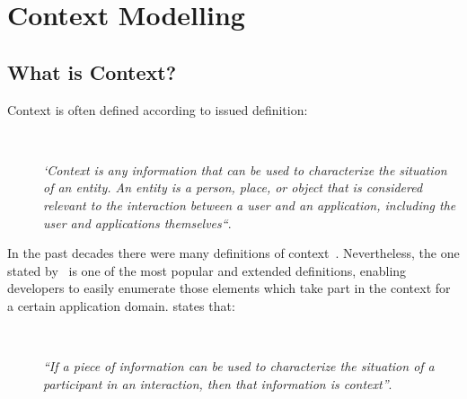 \section{Context Modelling}
\label{sec:context}
\subsection{What is Context?}
\label{sec:context_definition}

Context is often defined according to \citeauthor{dey_understanding_2001}
issued definition:

\begin{description}
  \item[] \hfill \\
  \begin{mdframed}[hidealllines=true,backgroundcolor=gray!20]
  \textit{`Context is any information that can be used to characterize the situation
  of an entity. An entity is a person, place, or object that is considered 
  relevant to the interaction between a user and an application, including the 
  user and applications themselves``}.
  \end{mdframed}
\end{description}

In the past decades there were many definitions of context~\citep{adomavicius_context_aware_2011}.
Nevertheless, the one stated by~\citeauthor{dey_understanding_2001} is one of 
the most popular and extended definitions, enabling developers to easily 
enumerate those elements which take part in the context for a certain application 
domain. \citeauthor{dey_understanding_2001} states that:

\begin{description}
  \item[] \hfill \\
  \begin{mdframed}[hidealllines=true,backgroundcolor=gray!20]
  \textit{``If a piece of information can be used to characterize the situation 
  of a participant in an interaction, then that information is context''}.
  \end{mdframed}
\end{description}

